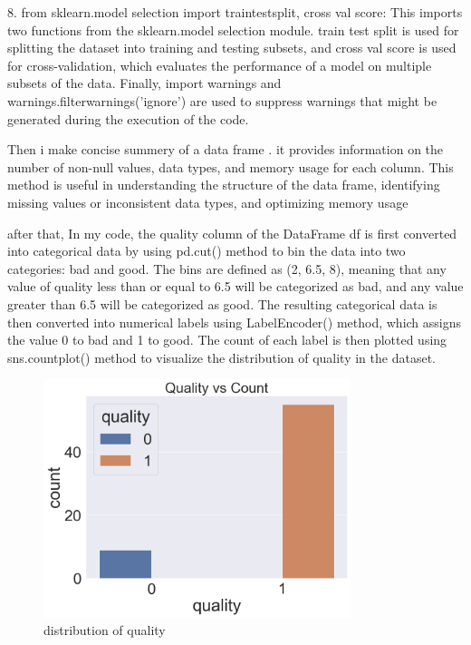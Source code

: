 \documentclass{article}
\begin{document}
8. from sklearn.model selection import traintestsplit, cross val score: This imports two functions from the sklearn.model selection module. train test split is used for splitting the dataset into training and testing subsets, and cross val score is used for cross-validation, which evaluates the performance of a model on multiple subsets of the data.
Finally, import warnings and warnings.filterwarnings('ignore') are used to suppress warnings that might be generated during the execution of the code.



Then i make concise summery of a data frame . it provides information  on the number of non-null values, data types, and memory usage for each column. This method is useful in understanding the structure of the data frame, identifying missing values or inconsistent data types, and optimizing memory usage


after that, In my code, the quality column of the DataFrame df is first converted into categorical data by using pd.cut() method to bin the data into two categories: bad and good. The bins are defined as (2, 6.5, 8), meaning that any value of quality less than or equal to 6.5 will be categorized as bad, and any value greater than 6.5 will be categorized as good. The resulting categorical data is then converted into numerical labels using LabelEncoder() method, which assigns the value 0 to bad and 1 to good. The count of each label is then plotted using sns.countplot() method to visualize the distribution of quality in the dataset.


\begin{figure}[h!]
  \centering
  \includegraphics[width=0.8\textwidth]{good and bad.png}
  \caption{distribution of quality}
\end{figure}
\end{document}
